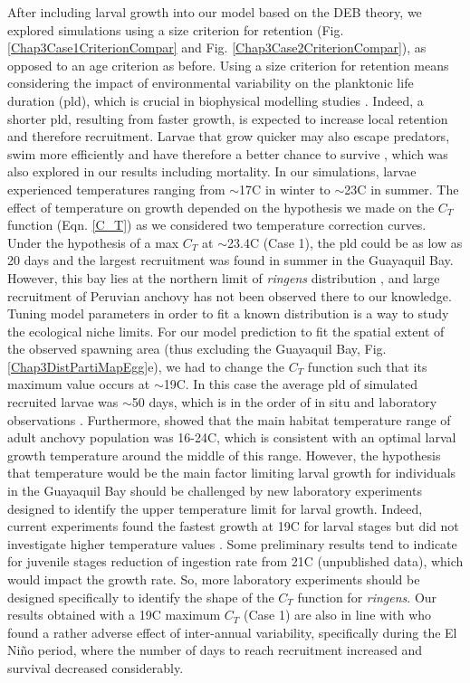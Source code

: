After including larval growth into our model based on the DEB theory, we explored simulations using a size criterion for retention (Fig. \ref{Chap3Case1CriterionCompar} and Fig. \ref{Chap3Case2CriterionCompar}), as opposed to an age criterion as before. Using a size criterion for retention means considering the impact of environmental variability on the planktonic life duration (\acrshort{pld}), which is crucial in biophysical modelling studies \citep{LettAyat2010}. Indeed, a shorter \acrshort{pld}, resulting from faster growth, is expected to increase local retention and therefore recruitment. Larvae that grow quicker may also escape predators, swim more efficiently and have therefore a better chance to survive \citep{Houd2008}, which was also explored in our results including mortality. In our simulations, larvae experienced temperatures ranging from $\sim$17\textdegree C in winter to $\sim$23\textdegree C in summer. The effect of temperature on growth depended on the hypothesis we made on the $C_T$ function (Eqn. \ref{C_T}) as we considered two temperature correction curves. Under the hypothesis of a max $C_T$ at $\sim$23.4\textdegree C (Case 1), the \acrshort{pld} could be as low as 20 days and the largest recruitment was found in summer in the Guayaquil Bay. However, this bay lies at the northern limit of \textit{\gls{ringens}} distribution \citep{CaldAyor2020}, and large recruitment of Peruvian anchovy has not been observed there to our knowledge. Tuning model parameters in order to fit a known distribution is a way to study the ecological niche limits. For our model prediction to fit the spatial extent of the observed spawning area (thus excluding the Guayaquil Bay, Fig. \ref{Chap3DistPartiMapEgg}e), we had to change the $C_T$ function such that its maximum value occurs at $\sim$19\textdegree C. In this case the average \acrshort{pld} of simulated recruited larvae was $\sim$50 days, which is in the order of in situ and laboratory observations \citep{PaloMuck1987}. Furthermore, \citep{CastPena2022} showed that the main habitat temperature range of adult anchovy population was 16-24\textdegree C, which is consistent with an optimal larval growth temperature around the middle of this range. However, the hypothesis that temperature would be the main factor limiting larval growth for individuals in the Guayaquil Bay should be challenged by new laboratory experiments designed to identify the upper temperature limit for larval growth. Indeed, current experiments found the fastest growth at 19\textdegree C for larval stages but did not investigate higher temperature values \citep{RiouOfel2021}. Some preliminary results tend to indicate for juvenile stages reduction of ingestion rate from 21\textdegree C (unpublished data), which would impact the growth rate. So, more laboratory experiments should be designed specifically to identify the shape of the $C_T$ function for \textit{\gls{ringens}}. Our results obtained with a 19\textdegree C maximum $C_T$ (Case 1) are also in line with \cite{XuChai2013} who found a rather adverse effect of inter-annual variability, specifically during the El Niño period, where the number of days to reach recruitment increased and survival decreased considerably.\\

